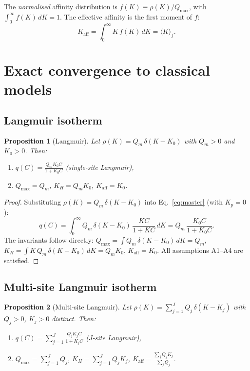 \documentclass[12pt]{article}
\newtheorem{proposition}{Proposition}
\begin{document}
The \emph{normalised} affinity distribution is
$f(K)\equiv\rho(K)/Q_{\max}$, with $\int_0^\infty f(K)\,dK=1$.
The effective affinity is the first moment of $f$:
\begin{equation}
  K_{\mathrm{aff}} = \int_0^\infty K\,f(K)\,dK = \langle K\rangle_f.
  \label{eq:Kaff_moment}
\end{equation}

\section{Exact convergence to classical models}
\label{sec:convergence}

\subsection{Langmuir isotherm}

\begin{proposition}[Langmuir]
\label{prop:langmuir}
Let $\rho(K)=Q_m\,\delta(K-K_0)$ with $Q_m>0$ and $K_0>0$.  Then:
\begin{enumerate}[nosep]
  \item $q(C) = \displaystyle\frac{Q_m K_0 C}{1+K_0 C}$
        \quad (single-site Langmuir),
  \item $Q_{\max}=Q_m$, \quad $K_H=Q_m K_0$, \quad
        $K_{\mathrm{aff}}=K_0$.
\end{enumerate}
\end{proposition}

\begin{proof}
Substituting $\rho(K)=Q_m\,\delta(K-K_0)$ into
Eq.~\eqref{eq:master} (with $K_p=0$):
\[
  q(C)=\int_0^\infty Q_m\,\delta(K-K_0)\,\frac{KC}{1+KC}\,dK
      = Q_m\,\frac{K_0 C}{1+K_0 C}.
\]
The invariants follow directly:
$Q_{\max}=\int Q_m\,\delta(K-K_0)\,dK=Q_m$,\;
$K_H=\int K\,Q_m\,\delta(K-K_0)\,dK=Q_m K_0$,\;
$K_{\mathrm{aff}}=K_0$.
All assumptions A1--A4 are satisfied.
\end{proof}

\subsection{Multi-site Langmuir isotherm}

\begin{proposition}[Multi-site Langmuir]
\label{prop:multilang}
Let $\rho(K)=\sum_{j=1}^{J}Q_j\,\delta(K-K_j)$ with
$Q_j>0$, $K_j>0$ distinct.  Then:
\begin{enumerate}[nosep]
  \item $q(C)=\displaystyle\sum_{j=1}^{J}
        \frac{Q_j K_j C}{1+K_j C}$
        \quad ($J$-site Langmuir),
  \item $Q_{\max}=\displaystyle\sum_{j=1}^{J}Q_j$, \quad
        $K_H=\displaystyle\sum_{j=1}^{J}Q_j K_j$, \quad
        $K_{\mathrm{aff}}=\displaystyle
        \frac{\sum_j Q_j K_j}{\sum_j Q_j}$.
\end{enumerate}
\end{proposition}
\end{document}

